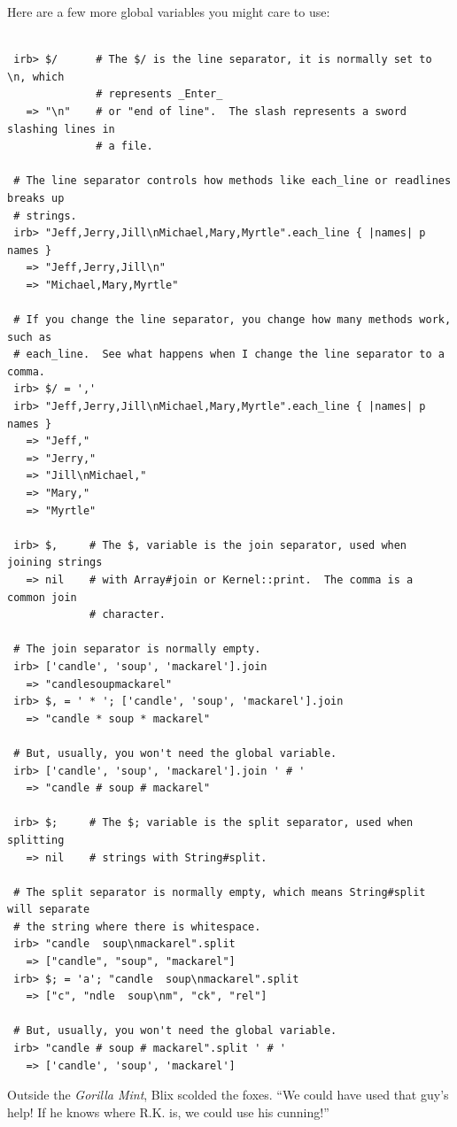 \documentclass[10pt,twoside]{report}
\begin{document}
Here are a few more global variables you might care to use:


\begin{lstlisting}

 irb> $/      # The $/ is the line separator, it is normally set to \n, which
              # represents _Enter_
   => "\n"    # or "end of line".  The slash represents a sword slashing lines in
              # a file.

 # The line separator controls how methods like each_line or readlines breaks up
 # strings.
 irb> "Jeff,Jerry,Jill\nMichael,Mary,Myrtle".each_line { |names| p names }
   => "Jeff,Jerry,Jill\n"
   => "Michael,Mary,Myrtle"

 # If you change the line separator, you change how many methods work, such as
 # each_line.  See what happens when I change the line separator to a comma.
 irb> $/ = ','
 irb> "Jeff,Jerry,Jill\nMichael,Mary,Myrtle".each_line { |names| p names }
   => "Jeff,"
   => "Jerry,"
   => "Jill\nMichael,"
   => "Mary,"
   => "Myrtle"

 irb> $,     # The $, variable is the join separator, used when joining strings
   => nil    # with Array#join or Kernel::print.  The comma is a common join
             # character.

 # The join separator is normally empty.
 irb> ['candle', 'soup', 'mackarel'].join
   => "candlesoupmackarel"
 irb> $, = ' * '; ['candle', 'soup', 'mackarel'].join
   => "candle * soup * mackarel"

 # But, usually, you won't need the global variable.
 irb> ['candle', 'soup', 'mackarel'].join ' # '
   => "candle # soup # mackarel"

 irb> $;     # The $; variable is the split separator, used when splitting
   => nil    # strings with String#split.

 # The split separator is normally empty, which means String#split will separate
 # the string where there is whitespace.
 irb> "candle  soup\nmackarel".split
   => ["candle", "soup", "mackarel"]
 irb> $; = 'a'; "candle  soup\nmackarel".split
   => ["c", "ndle  soup\nm", "ck", "rel"]

 # But, usually, you won't need the global variable.
 irb> "candle # soup # mackarel".split ' # '
   => ['candle', 'soup', 'mackarel']

\end{lstlisting}


Outside the {\em Gorilla Mint}, Blix scolded the foxes.  ``We could
have used that guy's help!  If he knows where R.K. is, we could use
his cunning!''
\end{document}
